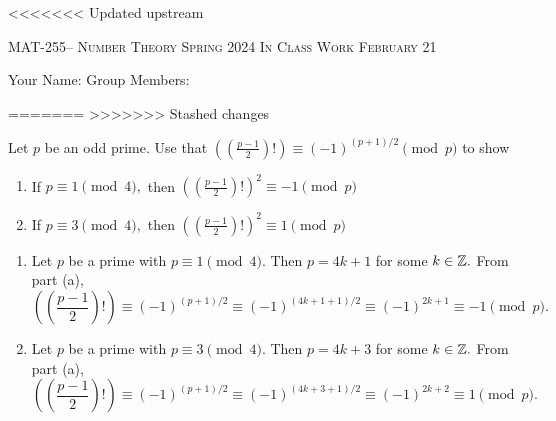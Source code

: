 \documentclass[handout]{ximera}
\date{February 21, 2024}
\date{\classday, 2024}
\begin{document}
\handoutAbstract
\maketitle
<<<<<<< Updated upstream
  \begin{center}%
    {\large \scshape MAT-255-- Number Theory \hfill Spring 2024 \hfill In Class Work February 21}%
    
    {\large
        Your Name: \hrulefill \quad Group Members:\hrulefill \quad \hrulefill
	\par}%
  \end{center}%
=======
>>>>>>> Stashed changes


  \begin{br}
    Let $p$ be an odd prime. Use that $\left(\left(\frac{p-1}{2}\right)!\right)\equiv (-1)^{(p+1)/2} \pmod{p}$ to show
    \begin{enumerate}
        
        \item If $p\equiv 1\pmod{4},$ then $\left(\left(\frac{p-1}{2}\right)!\right)^2\equiv -1 \pmod{p}$
        
        \item If $p\equiv 3\pmod{4},$ then $\left(\left(\frac{p-1}{2}\right)!\right)^2\equiv 1 \pmod{p}$
    \end{enumerate}

    \begin{solution}

        \begin{enumerate}
            
            \item Let $p$ be a prime with $p\equiv 1 \pmod 4.$ Then $p=4k+1$ for some $k\in\mathbb Z.$ From part (a), 
            \[\left(\left(\frac{p-1}{2}\right)!\right)\equiv (-1)^{(p+1)/2} \equiv (-1)^{(4k+1+1)/2}\equiv (-1)^{2k+1}\equiv -1 \pmod{p}.\]

            \item Let $p$ be a prime with $p\equiv 3 \pmod 4.$ Then $p=4k+3$ for some $k\in\mathbb Z.$ From part (a), 
            \[\left(\left(\frac{p-1}{2}\right)!\right)\equiv (-1)^{(p+1)/2} \equiv (-1)^{(4k+3+1)/2}\equiv (-1)^{2k+2}\equiv 1 \pmod{p}.\]
            
        \end{enumerate}
        
    \end{solution}
\end{br}


  
\end{document}
